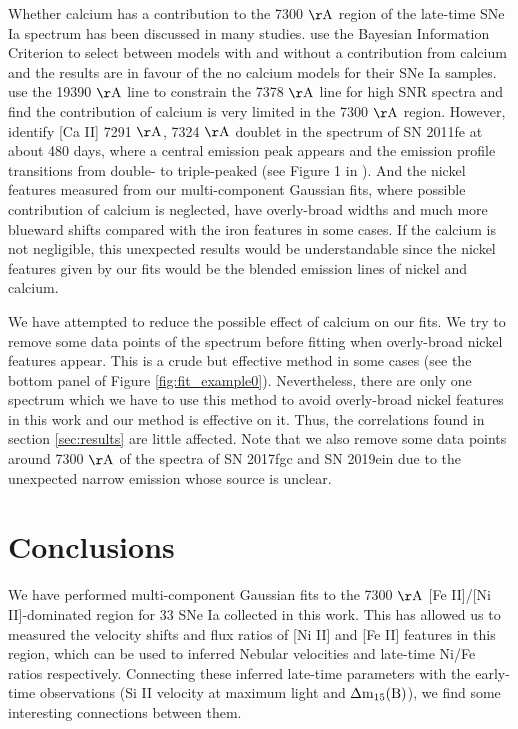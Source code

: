 \documentclass[twocolumn]{aastex631}
\begin{document}
Whether calcium has a contribution to the 7300 $\rm \AA$ region of the late-time SNe Ia spectrum has been discussed in many studies. \citet{2018MNRAS.477.3567M} use the Bayesian Information Criterion to select between models with and without a contribution from calcium and the results are in favour of the no calcium models for their SNe Ia samples. \citet{2020MNRAS.491.2902F} use the 19390 $\rm \AA$ line to constrain the 7378 $\rm \AA$ line for high SNR spectra and find the contribution of calcium is very limited in the 7300 $\rm \AA$ region. However, \citet{2021arXiv211100016T} identify [Ca II] 7291 $\rm \AA$, 7324 $\rm \AA$ doublet in the spectrum of SN 2011fe at about 480 days, where a central emission peak appears and the emission profile transitions from double- to triple-peaked (see Figure 1 in \citealt{2021arXiv211100016T}). And the nickel features measured from our multi-component Gaussian fits, where possible contribution of calcium is neglected, have overly-broad widths and much more blueward shifts compared with the iron features in some cases. If the calcium is not negligible, this unexpected results would be understandable since the nickel features given by our fits would be the blended emission lines of nickel and calcium.   

We have attempted to reduce the possible effect of calcium on our fits. We try to remove some data points of the spectrum before fitting when overly-broad nickel features appear. This is a crude but effective method in some cases (see the bottom panel of Figure \ref{fig:fit_example0}).  Nevertheless, there are only one spectrum which we have to use this method to avoid overly-broad nickel features in this work and our method is effective on it. Thus, the correlations found in section \ref{sec:results} are little affected. Note that we also remove some data points around 7300 $\rm \AA$ of the spectra of SN 2017fgc and SN 2019ein due to the unexpected narrow emission whose source is unclear.       

\section{Conclusions} \label{sec:conclusion}

We have performed multi-component Gaussian fits to the 7300 $\rm \AA$ [Fe II]/[Ni II]-dominated region for 33 SNe Ia collected in this work. This has allowed us to measured the velocity shifts and flux ratios of [Ni II] and [Fe II] features in this region, which can be used to inferred Nebular velocities and late-time Ni/Fe ratios respectively. Connecting these inferred late-time parameters with the early-time observations (Si II velocity at maximum light and $\rm {\Delta}m_{15}(B)$), we find some interesting connections between them.
\end{document}
